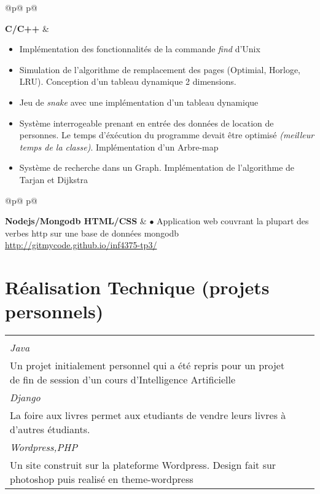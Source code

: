 \documentclass[a4paper,10pt]{extarticle}
\makeatletter
\newlength{\indicewidth}%
\newlength{\separatorcolumnwidth}%
\newlength{\maincolumnwidth}%
\newlength{\spacecvline}%
\newcommand{\cvdetailitem}[3][\spacecvline]{
\noindent\begin{tabular}
{@{}p{\indicewidth}@{\hspace{\separatorcolumnwidth}} p{\maincolumnwidth}@{}}
	\raggedright{\bf{#2}} &{ #3}%
\end{tabular}%
\vspace{-0.9em}\par\addvspace{#1}  }
\newcommand{\cvdetaillist}[3][.25em]{}
\renewcommand{\cvdetaillist}[3][.25em]{%
  \cvdetailitem[#1]{#2}{#3}}
\newcommand{\cvboxitem}[5]{}
\renewcommand{\cvboxitem}[5]{%
	\begin{minipage}[t]{\linewidth}
	
	$\bullet$ \textbf{#1}
	\ifthenelse{\equal{#2}{}}{}{, {\slshape #2}}\par%
	\raggedright{\scriptsize\href{#3}{#3}}\\
	{\small\slshape\color{Bittersweet} {#4}}\vspace{0.2em}\\
	{#5}

	\end{minipage}
	
}
\newcommand{\cvtriplebox}[3]{}
\renewcommand{\cvtriplebox}[3]{
\begin{tabular*}{\linewidth}{  
                   p{\dimexpr 0.33\linewidth-1\tabcolsep } 
                   p{\dimexpr 0.33\linewidth-1\tabcolsep }  
                   p{\dimexpr 0.33\linewidth-1\tabcolsep } 
                   } 
{#1}&{#2}&{#3}\tabularnewline
\end{tabular*}
}
\makeatother
\begin{document}
\cvdetaillist{C/C++}{
\begin{itemize}\setlength{\itemsep}{1pt}
  \setlength{\parskip}{5pt}
  \setlength{\parsep}{0pt}
\item Implémentation des fonctionnalités de la commande \emph{find} d'Unix
\item Simulation de l'algorithme de remplacement des pages (Optimial, Horloge, LRU). Conception d'un tableau dynamique 2 dimensions.

\item Jeu de \emph{snake} avec une implémentation d'un tableau dynamique
\item Système interrogeable prenant en entrée des données de location de personnes. Le temps d'éxécution du programme devait être optimisé \emph{(meilleur temps de la classe)}. Implémentation d'un Arbre-map
\item Système de recherche dans un Graph. Implémentation de l'algorithme de Tarjan et Dijkstra
\end{itemize}
}
\cvdetaillist{\small Nodejs/Mongodb HTML/CSS}{$\bullet$ Application web couvrant la plupart des verbes http sur une base de données mongodb   \newline\small{\href{http://gitmycode.github.io/inf4375-tp3/}{http://gitmycode.github.io/inf4375-tp3/}}}
\vspace{1em}\par










\vspace{-0.5em}
\section{Réalisation Technique \small(projets personnels)}

\cvtriplebox
{\cvboxitem{MineSweeper AI}{}{https://github.com/GitMyCode/Minesweeper-AI}{Java}
{Un projet initialement personnel qui a été repris pour un projet de fin de session d'un cours d'Intelligence Artificielle}}
{\cvboxitem{Encefal}{projet en collaboration}{http://foireauxlivres.uqam.ca/}{Django}
{La foire aux livres permet aux etudiants de vendre leurs livres à d'autres étudiants.}}
{
\cvboxitem{Site web}{abandonné}{www.courspiano.ca}{Wordpress,PHP}
{Un site construit sur la plateforme Wordpress. Design fait sur photoshop puis realisé en theme-wordpress}
}
\end{document}
